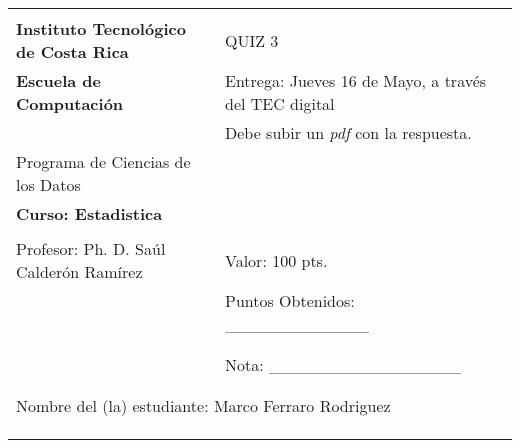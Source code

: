 \documentclass[spanish]{article}
\providecommand{\tabularnewline}{\\}
\begin{document}
\begin{flushleft}
\begin{tabular}{|l|l|}
\hline 
 & \tabularnewline
\textbf{\large{}Instituto Tecnológico de Costa Rica} & QUIZ 3\tabularnewline
\textbf{\large{}Escuela de Computación} & Entrega: Jueves 16 de Mayo, a través del TEC digital\tabularnewline
 & Debe subir un \emph{pdf }con la respuesta.\tabularnewline
Programa de Ciencias de los Datos & \tabularnewline
\textbf{Curso: Estadistica} & \tabularnewline
 & \tabularnewline
Profesor: Ph. D. Saúl Calderón Ramírez & Valor: 100 pts.\tabularnewline
 & Puntos Obtenidos: \_\_\_\_\_\_\_\_\_\_\_\_\tabularnewline
 & \tabularnewline
 & \tabularnewline
 & Nota: \_\_\_\_\_\_\_\_\_\_\_\_\_\_\_\_\tabularnewline
 & \tabularnewline
\cline{2-2} 
\multicolumn{2}{|c|}{}\tabularnewline
\multicolumn{2}{|l|}{Nombre del (la) estudiante: Marco Ferraro Rodriguez}\tabularnewline
\multicolumn{1}{|l}{} & \tabularnewline
\multicolumn{1}{|l}{} & \tabularnewline
\multicolumn{1}{|l}{} & \tabularnewline
\hline 
\end{tabular}
\par\end{flushleft}
\end{document}
